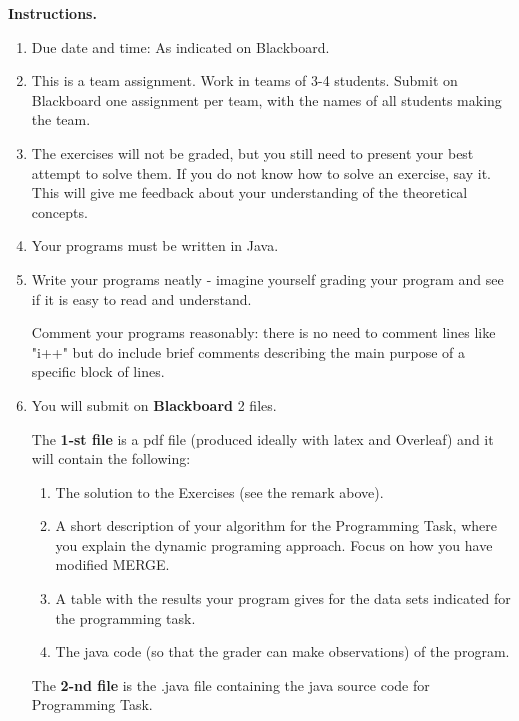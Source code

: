 \documentclass[11pt]{article}
\begin{document}
\vline

\textbf{Instructions.}
\begin{enumerate}
\item Due date and time: As indicated on Blackboard. 
\item This is a team assignment. Work in teams of 3-4 students.  Submit on Blackboard one assignment per team, with the names of all students making the team. 
\item The exercises will not be graded, but you still need to present your best attempt to solve them. If you do not know how to solve an exercise, say it.  This will give me feedback about your understanding of the theoretical concepts.
\item Your programs must be written in Java.

\item Write your programs neatly - imagine yourself grading your program and see if it is easy to read and understand. 

Comment your programs reasonably: there is no need to comment lines like "i++" but do include brief comments describing the main purpose of a specific block of lines.
\item  You will submit on \textbf{Blackboard} 2 files.  

The \textbf{1-st file} is a pdf file (produced ideally with latex and Overleaf) and it will contain the following:
\begin{enumerate}
\item The solution to the Exercises (see the remark above).
\item   A short description of your algorithm for the Programming Task, where you explain the dynamic programing approach. Focus on how you have modified MERGE.
\item   A table with the results your program gives  for the data sets indicated for the programming task. 
\item   The java code (so that the grader can make observations) of the  program.
\end{enumerate}


The \textbf{2-nd file} is the .java file containing the java source code for Programming Task.

\end{enumerate}
\newpage
\end{document}
